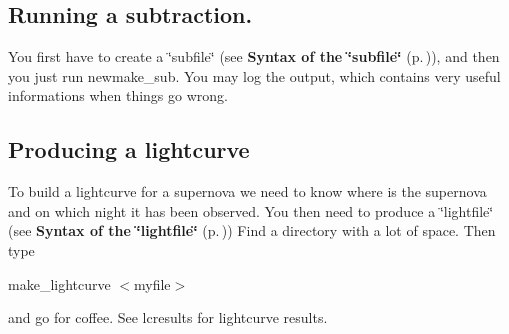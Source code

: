 \subsection{Running a subtraction.}\label{subtracting}
 You first have to create a \char`\"{}subfile\char`\"{} (see {\bf Syntax of the \char`\"{}subfile\char`\"{}} {\rm (p.\,\pageref{subfile})}),  and then you just run newmake\_\-sub. You may log the output, which contains very useful informations when things go wrong.

\subsection{Producing a lightcurve}\label{lightcurve}
 To build a lightcurve for a supernova we need to know where is the  supernova and on which night it has been observed. You then need  to produce a \char`\"{}lightfile\char`\"{} (see {\bf Syntax of the \char`\"{}lightfile\char`\"{}} {\rm (p.\,\pageref{lightfile})}) Find a directory with a lot of space. Then type

make\_\-lightcurve $<$myfile$>$

and go for coffee. See lcresults for lightcurve results.

